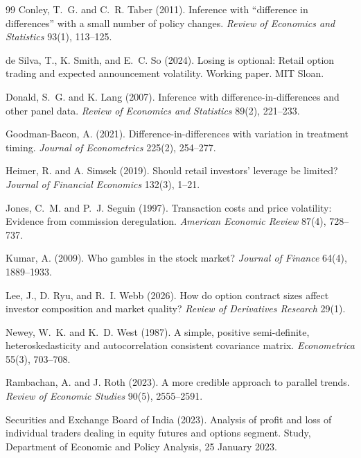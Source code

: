 \documentclass[12pt]{article}
\begin{document}
\begin{thebibliography}{99}
Conley, T.~G. and C.~R. Taber (2011).
Inference with ``difference in differences'' with a small number of policy
changes.
\emph{Review of Economics and Statistics} 93(1), 113--125.

de Silva, T., K. Smith, and E.~C. So (2024).
Losing is optional: Retail option trading and expected announcement
volatility.
Working paper. MIT Sloan.

Donald, S.~G. and K. Lang (2007).
Inference with difference-in-differences and other panel data.
\emph{Review of Economics and Statistics} 89(2), 221--233.

Goodman-Bacon, A. (2021).
Difference-in-differences with variation in treatment timing.
\emph{Journal of Econometrics} 225(2), 254--277.

Heimer, R. and A. Simsek (2019).
Should retail investors' leverage be limited?
\emph{Journal of Financial Economics} 132(3), 1--21.

Jones, C.~M. and P.~J. Seguin (1997).
Transaction costs and price volatility: Evidence from commission
deregulation.
\emph{American Economic Review} 87(4), 728--737.

Kumar, A. (2009).
Who gambles in the stock market?
\emph{Journal of Finance} 64(4), 1889--1933.

Lee, J., D. Ryu, and R.~I. Webb (2026).
How do option contract sizes affect investor composition and market
quality?
\emph{Review of Derivatives Research} 29(1).

Newey, W.~K. and K.~D. West (1987).
A simple, positive semi-definite, heteroskedasticity and autocorrelation
consistent covariance matrix.
\emph{Econometrica} 55(3), 703--708.

Rambachan, A. and J. Roth (2023).
A more credible approach to parallel trends.
\emph{Review of Economic Studies} 90(5), 2555--2591.

Securities and Exchange Board of India (2023).
Analysis of profit and loss of individual traders dealing in equity
futures and options segment.
Study, Department of Economic and Policy Analysis, 25 January 2023.


\end{thebibliography}
\end{document}

